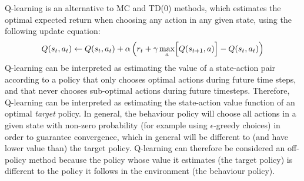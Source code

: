 Q-learning is an alternative to MC and TD(0) methods, which estimates the optimal expected return when choosing any action in any given state, using the following update equation:
\begin{equation*}
    Q(s_t, a_t) \leftarrow Q(s_t, a_t) + \alpha \left( r_t + \gamma \max_a \Bigl[ Q(s_{t+1}, a) \Bigr] - Q(s_t, a_t) \right)
\end{equation*}
Q-learning can be interpreted as estimating the value of a state-action pair according to a policy that only chooses optimal actions during future time steps, and that never chooses sub-optimal actions during future timesteps. Therefore, Q-learning can be interpreted as estimating the state-action value function of an optimal \emph{target} policy. In general, the behaviour policy will choose all actions in a given state with non-zero probability (for example using $\epsilon$-greedy choices) in order to guarantee convergence, which in general will be different to (and have lower value than) the target policy. Q-learning can therefore be considered an off-policy method because the policy whose value it estimates (the target policy) is different to the policy it follows in the environment (the behaviour policy).
